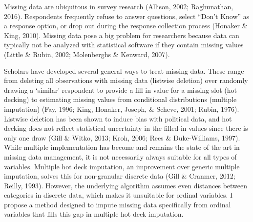 \documentclass[12pt,econ]{sources/authesis}
\begin{document}
Missing data are ubiquitous in survey research (Allison, 2002; Raghunathan, 2016). Respondents frequently refuse to answer questions, select ``Don't Know'' as a response option, or drop out during the response collection process (Honaker \& King, 2010). Missing data pose a big problem for researchers because data can typically not be analyzed with statistical software if they contain missing values (Little \& Rubin, 2002; Molenberghs \& Kenward, 2007).

Scholars have developed several general ways to treat missing data. These range from deleting all observations with missing data (listwise deletion) over randomly drawing a `similar' respondent to provide a fill-in value for a missing slot (hot decking) to estimating missing values from conditional distributions (multiple imputation) (Fay, 1996; King, Honaker, Joseph, \& Scheve, 2001; Rubin, 1976). Listwise deletion has been shown to induce bias with political data, and hot decking does not reflect statistical uncertainty in the filled-in values since there is only one draw (Gill \& Witko, 2013; Kroh, 2006; Rees \& Duke-Williams, 1997). While multiple implementation has become and remains the state of the art in missing data management, it is not necessarily always suitable for all types of variables. Multiple hot deck imputation, an improvement over generic multiple imputation, solves this for non-granular discrete data (Gill \& Cranmer, 2012; Reilly, 1993). However, the underlying algorithm assumes even distances between categories in discrete data, which makes it unsuitable for ordinal variables. I propose a method designed to impute missing data specifically from ordinal variables that fills this gap in multiple hot deck imputation.
\end{document}

